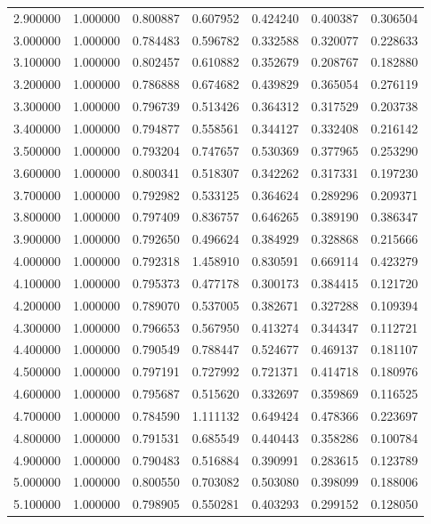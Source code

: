\begin{table}
\begin{tabular}{rrrrrrr}
2.900000 & 1.000000 & 0.800887 & 0.607952 & 0.424240 & 0.400387 & 0.306504 \\
3.000000 & 1.000000 & 0.784483 & 0.596782 & 0.332588 & 0.320077 & 0.228633 \\
3.100000 & 1.000000 & 0.802457 & 0.610882 & 0.352679 & 0.208767 & 0.182880 \\
3.200000 & 1.000000 & 0.786888 & 0.674682 & 0.439829 & 0.365054 & 0.276119 \\
3.300000 & 1.000000 & 0.796739 & 0.513426 & 0.364312 & 0.317529 & 0.203738 \\
3.400000 & 1.000000 & 0.794877 & 0.558561 & 0.344127 & 0.332408 & 0.216142 \\
3.500000 & 1.000000 & 0.793204 & 0.747657 & 0.530369 & 0.377965 & 0.253290 \\
3.600000 & 1.000000 & 0.800341 & 0.518307 & 0.342262 & 0.317331 & 0.197230 \\
3.700000 & 1.000000 & 0.792982 & 0.533125 & 0.364624 & 0.289296 & 0.209371 \\
3.800000 & 1.000000 & 0.797409 & 0.836757 & 0.646265 & 0.389190 & 0.386347 \\
3.900000 & 1.000000 & 0.792650 & 0.496624 & 0.384929 & 0.328868 & 0.215666 \\
4.000000 & 1.000000 & 0.792318 & 1.458910 & 0.830591 & 0.669114 & 0.423279 \\
4.100000 & 1.000000 & 0.795373 & 0.477178 & 0.300173 & 0.384415 & 0.121720 \\
4.200000 & 1.000000 & 0.789070 & 0.537005 & 0.382671 & 0.327288 & 0.109394 \\
4.300000 & 1.000000 & 0.796653 & 0.567950 & 0.413274 & 0.344347 & 0.112721 \\
4.400000 & 1.000000 & 0.790549 & 0.788447 & 0.524677 & 0.469137 & 0.181107 \\
4.500000 & 1.000000 & 0.797191 & 0.727992 & 0.721371 & 0.414718 & 0.180976 \\
4.600000 & 1.000000 & 0.795687 & 0.515620 & 0.332697 & 0.359869 & 0.116525 \\
4.700000 & 1.000000 & 0.784590 & 1.111132 & 0.649424 & 0.478366 & 0.223697 \\
4.800000 & 1.000000 & 0.791531 & 0.685549 & 0.440443 & 0.358286 & 0.100784 \\
4.900000 & 1.000000 & 0.790483 & 0.516884 & 0.390991 & 0.283615 & 0.123789 \\
5.000000 & 1.000000 & 0.800550 & 0.703082 & 0.503080 & 0.398099 & 0.188006 \\
5.100000 & 1.000000 & 0.798905 & 0.550281 & 0.403293 & 0.299152 & 0.128050 \\

\end{tabular}
\end{table}

